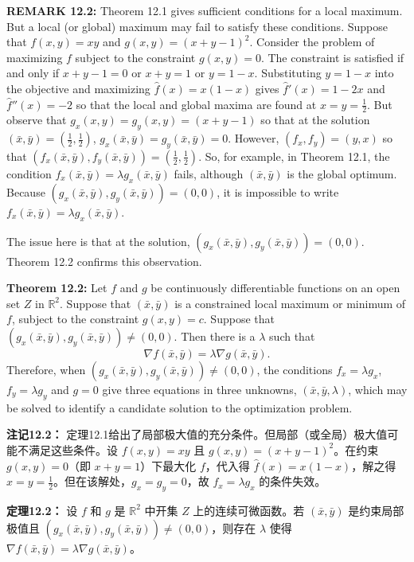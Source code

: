 \begin{original}
\textbf{REMARK 12.2:} Theorem 12.1 gives sufficient conditions for a local maximum. But a local (or global) maximum may fail to satisfy these conditions. Suppose that $f(x, y) = xy$ and $g(x, y) = (x + y - 1)^2$. Consider the problem of maximizing $f$ subject to the constraint $g(x, y) = 0$. The constraint is satisfied if and only if $x + y - 1 = 0$ or $x + y = 1$ or $y = 1 - x$. Substituting $y = 1 - x$ into the objective and maximizing $\hat{f}(x) = x(1-x)$ gives $\hat{f}'(x) = 1-2x$ and $\hat{f}''(x) = -2$ so that the local and global maxima are found at $x = y = \frac{1}{2}$. But observe that $g_x(x, y) = g_y(x, y) = (x + y - 1)$ so that at the solution $(\bar{x}, \bar{y}) = (\frac{1}{2}, \frac{1}{2})$, $g_x(\bar{x}, \bar{y}) = g_y(\bar{x}, \bar{y}) = 0$. However, $(f_x, f_y) = (y, x)$ so that $(f_x(\bar{x}, \bar{y}), f_y(\bar{x}, \bar{y})) = (\frac{1}{2}, \frac{1}{2})$. So, for example, in Theorem 12.1, the condition $f_x(\bar{x}, \bar{y}) = \lambda g_x(\bar{x}, \bar{y})$ fails, although $(\bar{x}, \bar{y})$ is the global optimum. Because $(g_x(\bar{x}, \bar{y}), g_y(\bar{x}, \bar{y})) = (0,0)$, it is impossible to write $f_x(\bar{x}, \bar{y}) = \lambda g_x(\bar{x}, \bar{y})$.

The issue here is that at the solution, $(g_x(\bar{x}, \bar{y}), g_y(\bar{x}, \bar{y})) = (0,0)$. Theorem 12.2 confirms this observation.

\textbf{Theorem 12.2:} Let $f$ and $g$ be continuously differentiable functions on an open set $Z$ in $\mathbb{R}^2$. Suppose that $(\bar{x}, \bar{y})$ is a constrained local maximum or minimum of $f$, subject to the constraint $g(x, y) = c$. Suppose that $(g_x(\bar{x}, \bar{y}), g_y(\bar{x}, \bar{y})) \neq (0,0)$. Then there is a $\lambda$ such that
\[
\nabla f(\bar{x}, \bar{y}) = \lambda \nabla g(\bar{x}, \bar{y}).
\]
Therefore, when $(g_x(\bar{x}, \bar{y}), g_y(\bar{x}, \bar{y})) \neq (0,0)$, the conditions $f_x = \lambda g_x$, $f_y = \lambda g_y$ and $g = 0$ give three equations in three unknowns, $(\bar{x}, \bar{y}, \lambda)$, which may be solved to identify a candidate solution to the optimization problem.
\end{original}
\begin{translation}
\textbf{注记12.2：} 定理12.1给出了局部极大值的充分条件。但局部（或全局）极大值可能不满足这些条件。设 $f(x, y) = xy$ 且 $g(x, y) = (x + y - 1)^2$。在约束 $g(x, y) = 0$（即 $x+y=1$）下最大化 $f$，代入得 $\hat{f}(x) = x(1-x)$，解之得 $x = y = \frac{1}{2}$。但在该解处，$g_x = g_y = 0$，故 $f_x = \lambda g_x$ 的条件失效。

\textbf{定理12.2：} 设 $f$ 和 $g$ 是 $\mathbb{R}^2$ 中开集 $Z$ 上的连续可微函数。若 $(\bar{x}, \bar{y})$ 是约束局部极值且 $(g_x(\bar{x}, \bar{y}), g_y(\bar{x}, \bar{y})) \neq (0,0)$，则存在 $\lambda$ 使得 $\nabla f(\bar{x}, \bar{y}) = \lambda \nabla g(\bar{x}, \bar{y})$。
\end{translation}

